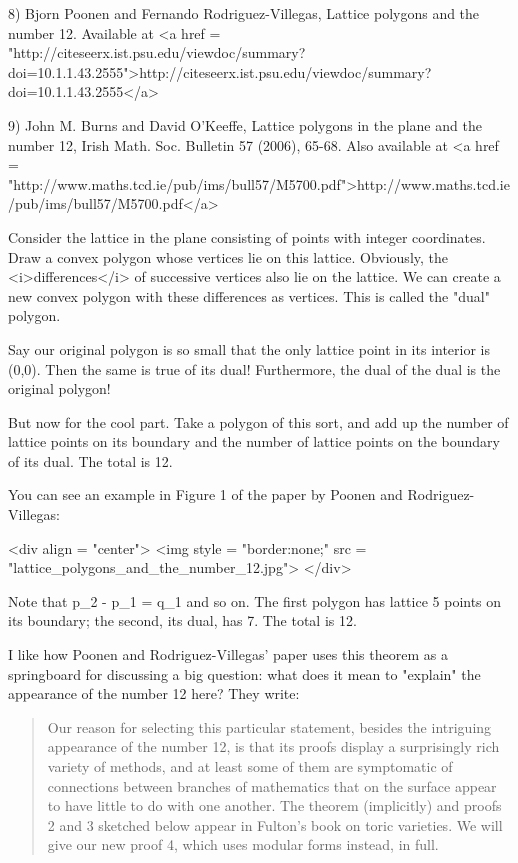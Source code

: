 8) Bjorn Poonen and Fernando Rodriguez-Villegas, Lattice polygons
and the number 12.  Available at 
<a href = "http://citeseerx.ist.psu.edu/viewdoc/summary?doi=10.1.1.43.2555">http://citeseerx.ist.psu.edu/viewdoc/summary?doi=10.1.1.43.2555</a>

9) John M. Burns and David O'Keeffe, Lattice polygons in the plane
and the number 12, Irish Math. Soc. Bulletin 57 (2006), 65-68.
Also available at <a href = "http://www.maths.tcd.ie/pub/ims/bull57/M5700.pdf">http://www.maths.tcd.ie/pub/ims/bull57/M5700.pdf</a>

Consider the lattice in the plane consisting of points with integer
coordinates.  Draw a convex polygon whose vertices lie on this lattice.   
Obviously, the <i>differences</i> of successive vertices also lie on the 
lattice.  We can create a new convex polygon with these differences as 
vertices.  This is called the "dual" polygon.  

Say our original polygon is so small that the only lattice point in its
interior is (0,0).  Then the same is true of its dual!  Furthermore, 
the dual of the dual is the original polygon!

But now for the cool part.  Take a polygon of this sort, and add up the 
number of lattice points on its boundary and the number of lattice 
points on the boundary of its dual.  The total is 12.

You can see an example in Figure 1 of the paper by Poonen and
Rodriguez-Villegas:

<div align = "center">
<img style = "border:none;" src = "lattice_polygons_and_the_number_12.jpg">
</div>

Note that p_{2} - p_{1} = q_{1} and so on.
The first polygon has lattice 5 points on its boundary; the second,
its dual, has 7.  The total is 12.   

I like how Poonen and Rodriguez-Villegas' paper uses this theorem as a
springboard for discussing a big question: what does it mean to
"explain" the appearance of the number 12 here?
They write:

\begin{quote}
   Our reason for selecting this particular statement, besides the 
   intriguing appearance of the number 12, is that its proofs display 
   a surprisingly rich variety of methods, and at least some of them 
   are symptomatic of connections between branches of mathematics that 
   on the surface appear to have little to do with one another.  The 
   theorem (implicitly) and proofs 2 and 3 sketched below appear in 
   Fulton's book on toric varieties.  We will give our new proof 4, 
   which uses modular forms instead, in full.
\end{quote}

